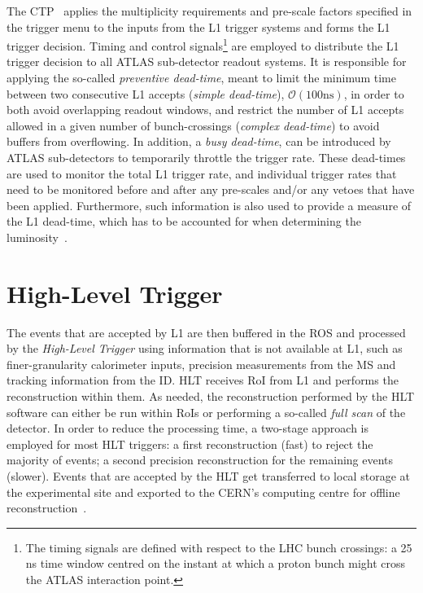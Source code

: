 			The \ac{CTP}~\cite{ATLASJINST} applies the multiplicity requirements and pre-scale factors specified in the trigger menu to the inputs from the \ac{L1} trigger systems and forms the \ac{L1} trigger decision. Timing and control signals\footnote{The timing signals are defined with respect to the \ac{LHC} bunch crossings: a 25 ns time window centred on the instant at which a proton bunch might cross the \ac{ATLAS} interaction point.} are employed to distribute the \ac{L1} trigger decision to all \ac{ATLAS} sub-detector readout systems. It is responsible for applying the so-called \emph{preventive dead-time}, meant to limit the minimum time between two consecutive \ac{L1} accepts (\emph{simple dead-time}), $\mathcal{O}(100 \mathrm{ns})$, in order to both avoid overlapping readout windows, and restrict the number of \ac{L1} accepts allowed in a given number of bunch-crossings (\emph{complex dead-time}) to avoid buffers from overflowing. In addition, a \emph{busy dead-time}, can be introduced by \ac{ATLAS} sub-detectors to temporarily throttle the trigger rate. These dead-times are used to monitor the total \ac{L1} trigger rate, and individual trigger rates that need to be monitored before and after any pre-scales and/or any vetoes that have been applied. Furthermore, such information is also used to provide a measure of the \ac{L1} dead-time, which has to be accounted for when determining the luminosity~\cite{ATLASTrigger2010}.

		

			


	\section{High-Level Trigger}
	\label{sec:HLT}

		The events that are accepted by \ac{L1} are then buffered in the \ac{ROS} and processed by the \emph{High-Level Trigger} using information that is not available at \ac{L1}, such as finer-granularity calorimeter inputs, precision measurements from the \ac{MS} and tracking information from the \ac{ID}. \ac{HLT} receives \ac{RoI} from \ac{L1} and performs the reconstruction within them. As needed, the reconstruction performed by the \ac{HLT} software can either be run within \ac{RoI}s or performing a so-called \emph{full scan} of the detector. In order to reduce the processing time, a two-stage approach is employed for most \ac{HLT} triggers: a first reconstruction (fast) to reject the majority of events; a second precision reconstruction for the remaining events (slower). Events that are accepted by the \ac{HLT} get transferred to local storage at the experimental site and exported to the CERN’s computing centre for offline reconstruction~\cite{ATLASTrigger2015}. 

